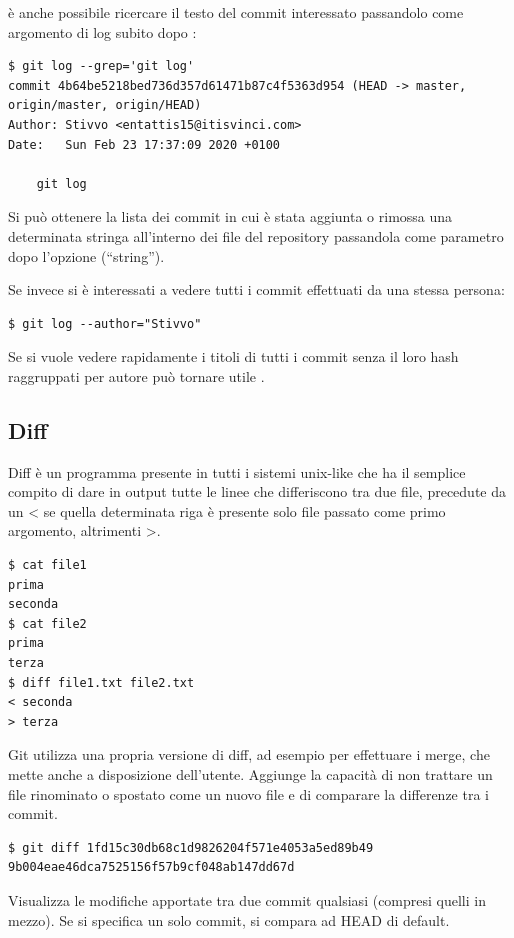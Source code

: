 \documentclass{article} \usepackage[textwidth=19cm,textheight=24cm]{geometry}
\begin{document}
è anche possibile ricercare il testo del commit interessato passandolo come
argomento di log subito dopo :

\begin{verbatim}
$ git log --grep='git log'
commit 4b64be5218bed736d357d61471b87c4f5363d954 (HEAD -> master, origin/master, origin/HEAD)
Author: Stivvo <entattis15@itisvinci.com>
Date:   Sun Feb 23 17:37:09 2020 +0100

    git log
\end{verbatim}

Si può ottenere la lista dei commit in cui è stata aggiunta o rimossa una
determinata stringa all'interno dei file del repository passandola come
parametro dopo l'opzione  (``string'').

Se invece si è interessati a vedere tutti i commit effettuati da una stessa
persona:

\begin{verbatim}
$ git log --author="Stivvo"
\end{verbatim}

Se si vuole vedere rapidamente i titoli di tutti i commit senza il loro hash 
raggruppati per autore può tornare utile .

\subsection{Diff}

Diff è un programma presente in tutti i sistemi unix-like che ha il semplice
compito di dare in output tutte le linee che differiscono tra due file,
precedute da un < se quella determinata riga è presente solo file passato come
primo argomento, altrimenti >.

\begin{verbatim}
$ cat file1
prima
seconda
$ cat file2
prima
terza
$ diff file1.txt file2.txt
< seconda
> terza
\end{verbatim}

Git utilizza una propria versione di diff, ad esempio per effettuare i merge,
che mette anche a disposizione dell'utente. Aggiunge la capacità di non trattare
un file rinominato o spostato come un nuovo file e di comparare la differenze
tra i commit.

\begin{verbatim}
$ git diff 1fd15c30db68c1d9826204f571e4053a5ed89b49 9b004eae46dca7525156f57b9cf048ab147dd67d
\end{verbatim}

Visualizza le modifiche apportate tra due commit qualsiasi (compresi
quelli in mezzo).
Se si specifica un solo commit, si compara ad HEAD di default.
\end{document}
